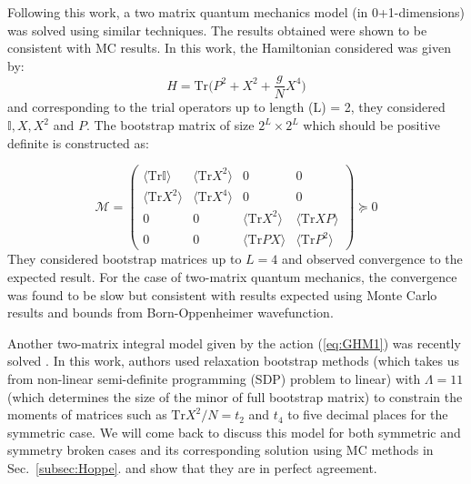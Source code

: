 \documentclass[11pt]{article}
\begin{document}
Following this work, a two matrix quantum mechanics 
model (in 0+1-dimensions) was solved using similar techniques. 
The results obtained were shown to be consistent with MC results. 
In this work, the Hamiltonian considered was given by:
\begin{equation}
H = \mbox{Tr} \Big( P^2 + X^2 + \frac{g}{N} X^4 \Big)
\end{equation}
and corresponding to the trial operators up to length (L) = 2, 
they considered $ \mathbb{I}, X, X^{2}$ and $P$. The bootstrap matrix
of size $2^L \times 2^L$ which should be positive definite is constructed as:

\begin{equation}
	\mathcal{M} = 
	\begin{pmatrix}
		\langle \mbox{Tr}\mathbb{I} \rangle & \langle \mbox{Tr} X^2 \rangle & 0 & 0 \\
		\langle \mbox{Tr} X^2 \rangle & \langle \mbox{Tr} X^4 \rangle  & 0 & 0 \\ 
		0 & 0 & \langle \mbox{Tr} X^2 \rangle & \langle \mbox{Tr} XP \rangle \\
		0 & 0  & \langle \mbox{Tr} PX \rangle & \langle \mbox{Tr} P^2 \rangle
	\end{pmatrix}  \succeq 0
\end{equation}
They considered bootstrap matrices up to $L=4$ and observed
convergence to the expected result. 
For the case of two-matrix quantum mechanics, the convergence
was found to be slow but consistent with results expected using 
Monte Carlo results and bounds from Born-Oppenheimer wavefunction. 

Another two-matrix integral model given by the action 
(\ref{eq:GHM1}) was recently solved \cite{Kazakov:2021lel}. 
In this work, authors used relaxation bootstrap methods (which takes us 
from non-linear semi-definite programming (SDP) problem to linear) with
$\Lambda=11$ (which determines the size of the minor of full bootstrap matrix) 
to constrain the moments of matrices such as $\mathrm{Tr}X^2/N = t_{2}$ and $t_{4}$ 
to five decimal places for the symmetric case. We will come back to 
discuss this model for both symmetric and symmetry broken cases 
and its corresponding solution using MC methods in Sec.~\ref{subsec:Hoppe}. 
and show that they are in perfect agreement.  
\end{document}
